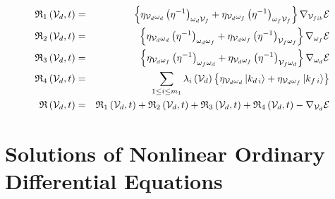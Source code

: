 \begin{eqnarray}
{\frak R}_{1}\left( {\cal V}_{d},t\right) &=&\left\{ \eta _{{\cal V}%
_{d}\omega _{d}}\left( \eta ^{-1}\right) _{{\cal \omega }_{d}{\cal V}%
_{f}}+\eta _{{\cal V}_{d}\omega _{f}}\left( \eta ^{-1}\right) _{{\cal \omega 
}_{f}{\cal V}_{f}}\right\} \nabla _{{\cal V}_{fib}}{\cal E}  \nonumber \\
{\frak R}_{2}\left( {\cal V}_{d},t\right) &=&\left\{ \eta _{{\cal V}%
_{d}\omega _{d}}\left( \eta ^{-1}\right) _{{\cal \omega }_{d}{\cal \omega }%
_{f}}+\eta _{{\cal V}_{d}\omega _{f}}\left( \eta ^{-1}\right) _{{\cal V}_{f}%
{\cal \omega }_{f}}\right\} \nabla _{\omega _{f}}{\cal E}  \nonumber \\
{\frak R}_{3}\left( {\cal V}_{d},t\right) &=&\left\{ \eta _{{\cal V}%
_{d}\omega _{f}}\left( \eta ^{-1}\right) _{{\cal \omega }_{f}{\cal \omega }%
_{d}}+\eta _{{\cal V}_{d}\omega _{f}}\left( \eta ^{-1}\right) _{{\cal V}_{f}%
{\cal \omega }_{d}}\right\} \nabla _{\omega _{d}}{\cal E}  \nonumber \\
{\frak R}_{4}\left( {\cal V}_{d},t\right) &=&\sum_{1\leq i\leq m_{1}}\lambda
_{i}\left( {\cal V}_{d}\right) \left\{ \eta _{{\cal V}_{d}\omega _{d}}\left|
k_{d\,i}\right\rangle +\eta _{{\cal V}_{d}\omega _{f}}\left|
k_{f\,i}\right\rangle \right\}  \nonumber \\
{\frak R}\left( {\cal V}_{d},t\right) &=&{\frak R}_{1}\left( {\cal V}%
_{d},t\right) +{\frak R}_{2}\left( {\cal V}_{d},t\right) +{\frak R}%
_{3}\left( {\cal V}_{d},t\right) +{\frak R}_{4}\left( {\cal V}_{d},t\right)
-\nabla _{{\cal V}_{d}}{\cal E}
\end{eqnarray}

\section{Solutions of Nonlinear Ordinary Differential Equations}

